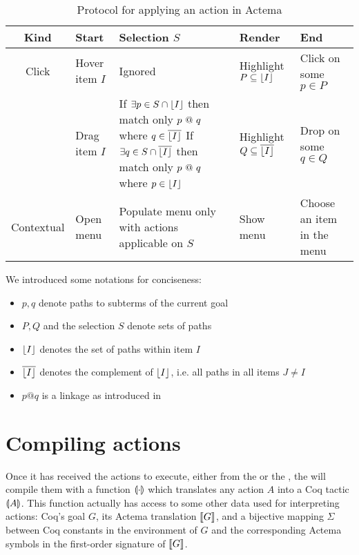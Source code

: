 \begin{table*}[]
  \def\arraystretch{1.5}
  \begin{tabular}{|c|C{0.2\textwidth}|C{0.4\textwidth}|C{0.25\textwidth}|C{0.2\textwidth}|}
  \hline
  \textbf{Kind} & \textbf{Start}       & \textbf{Selection $S$} &
  \textbf{Render}                      & \textbf{End} \\ \hline
  Click         & Hover item $I$       & Ignored & Highlight $P \subseteq
  \lfloor I \rfloor$ & Click on some $p \in P$    \\ \hline
             & Drag item $I$        &
      If $\exists p \in S \cap \lfloor I \rfloor$ then match only $p \operatorname{\,@\,} q$ where
      $q \in \overline{\lfloor I \rfloor}$
      \newline
      If $\exists q \in S \cap \overline{\lfloor I \rfloor}$ then match only $p
      \operatorname{\,@\,} q$ where $p \in \lfloor I \rfloor$
    & Highlight $Q \subseteq \overline{\lfloor I \rfloor}$ & Drop on some $q \in Q$ \\ \hline
  Contextual    & Open menu & Populate menu only with actions
  applicable on $S$ & Show menu & Choose an item in the menu \\ \hline
  \end{tabular}
  \raggedright
  \parbox{\textwidth}{
    \vspace{1.5em}
    We introduced some notations for conciseness:
    \begin{itemize}
      \item $p, q$ denote paths to subterms of the current goal
      \item $P, Q$ and the selection $S$ denote sets of paths
      \item $\lfloor I \rfloor$ denotes the set of paths within item $I$
      \item $\overline{\lfloor I \rfloor}$ denotes the complement of $\lfloor I \rfloor$, i.e.
      all paths in all items $J \not= I$
      \item $p @ q$ is a linkage as introduced in 
    \end{itemize}}

  \caption{Protocol for applying an action in Actema}
\end{table*}


\section{Compiling actions}

Once it has received the actions to execute, either from the 
or the , the  will compile them with a function
$\llparenthesis \cdot \rrparenthesis$ which translates any action $A$ into a Coq tactic
$\llparenthesis A \rrparenthesis$. This function actually has access to some other data used for
interpreting actions: Coq's goal $G$, its Actema translation $\llbracket G \rrbracket$, and a
bijective mapping $\Sigma$ between Coq constants in the environment of $G$ and
the corresponding Actema symbols in the first-order signature of $\llbracket G \rrbracket$.

